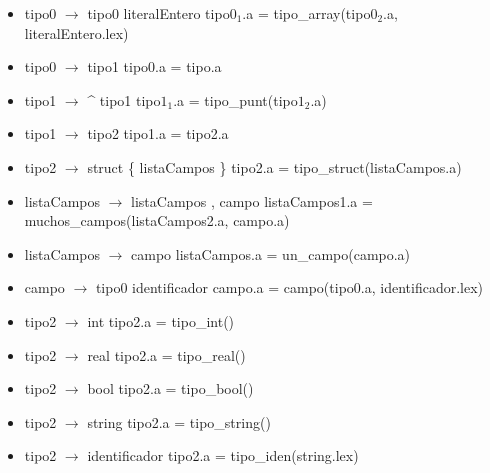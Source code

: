 \documentclass[11pt]{article}
\begin{document}
        \begin{itemize}
            \item tipo0 $\rightarrow$ tipo0 literalEntero 
                \subitem tipo$0_1$.a = tipo\_array(tipo$0_2$.a, literalEntero.lex)
            \item tipo0 $\rightarrow$ tipo1
                \subitem tipo0.a = tipo.a
            \item tipo1 $\rightarrow$ \^{} tipo1
                \subitem tipo$1_1$.a = tipo\_punt(tipo$1_2$.a)
            \item tipo1 $\rightarrow$ tipo2
                \subitem tipo1.a = tipo2.a
            \item tipo2 $\rightarrow$ struct \{ listaCampos \}
                \subitem tipo2.a = tipo\_struct(listaCampos.a)
            \item listaCampos $\rightarrow$ listaCampos , campo
                \subitem listaCampos1.a = muchos\_campos(listaCampos2.a, campo.a)
            \item listaCampos $\rightarrow$ campo
                \subitem listaCampos.a = un\_campo(campo.a)
            \item campo $\rightarrow$ tipo0 identificador
                \subitem campo.a = campo(tipo0.a, identificador.lex)
            \item tipo2 $\rightarrow$ int
                \subitem tipo2.a = tipo\_int()
            \item tipo2 $\rightarrow$ real
                \subitem tipo2.a = tipo\_real()
            \item tipo2 $\rightarrow$ bool
                \subitem tipo2.a = tipo\_bool()
            \item tipo2 $\rightarrow$ string
                \subitem tipo2.a = tipo\_string()
            \item tipo2 $\rightarrow$ identificador
                \subitem tipo2.a = tipo\_iden(string.lex)
        \end{itemize}
        \ 
\end{document}
